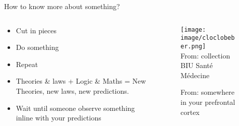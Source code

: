 \documentclass[10pt, notes=show]{beamer}
\begin{document}
\begin{frame}{}
        \textcolor{tracblue}{\large How to know more about something?}
        \vspace{1cm}
    \begin{columns}

        \begin{column}{0.6\linewidth}
            \begin{itemize}
                \item<3-> Cut in pieces
                \item<4-> Do something
                \item<5-> Repeat
            \end{itemize}

            \begin{itemize}
                \item<7-> Theories \& laws + Logic \& Maths = New  Theories, new laws, new predictions.
                \item<8-> Wait until someone observe something inline with your predictions 
            \end{itemize}


        \end{column}
        \begin{column}{0.3\linewidth}

            {
                \begin{figure}[h]
                    \centering
                    \texttt{[image: image/cloclobeber.png]}\\
                    {\tiny From: collection BIU Santé Médecine}
                \end{figure}
            }
            {
                \begin{figure}[h]
                    \centering
                    {\tiny From: somewhere in your prefrontal cortex}
                \end{figure}
            }


        \end{column}

    \end{columns}

\end{frame}
\end{document}
